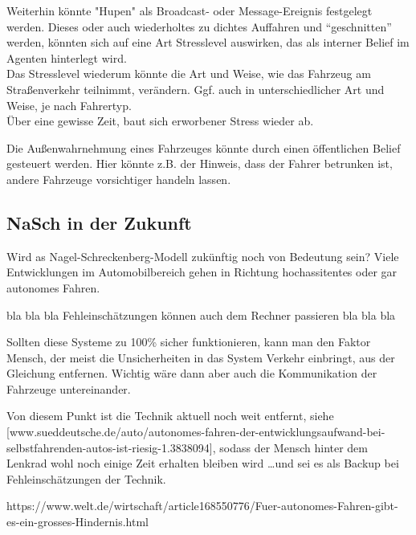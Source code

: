 Weiterhin könnte "Hupen" als Broadcast- oder Message-Ereignis festgelegt werden.
Dieses oder auch wiederholtes zu dichtes Auffahren und \enquote{geschnitten} werden, könnten sich auf eine Art Stresslevel auswirken, das als interner Belief im Agenten hinterlegt wird.
\\
Das Stresslevel wiederum könnte die Art und Weise, wie das Fahrzeug am Straßenverkehr teilnimmt, verändern. 
Ggf. auch in unterschiedlicher Art und Weise, je nach Fahrertyp.
\\
Über eine gewisse Zeit, baut sich erworbener Stress wieder ab.

Die Außenwahrnehmung eines Fahrzeuges könnte durch einen öffentlichen Belief gesteuert werden. 
Hier könnte z.B. der Hinweis, dass der Fahrer betrunken ist, andere Fahrzeuge vorsichtiger handeln lassen.








\subsection{NaSch in der Zukunft}

Wird as Nagel-Schreckenberg-Modell zukünftig noch von Bedeutung sein? 
Viele Entwicklungen im Automobilbereich gehen in Richtung hochassitentes oder gar autonomes Fahren.

bla bla bla Fehleinschätzungen können auch dem Rechner passieren bla bla bla

Sollten diese Systeme zu 100\% sicher funktionieren, kann man den Faktor Mensch, der meist die Unsicherheiten in das System Verkehr einbringt, aus der Gleichung entfernen.
Wichtig wäre dann aber auch die Kommunikation der Fahrzeuge untereinander.

Von diesem Punkt ist die Technik aktuell noch weit entfernt, siehe [www.sueddeutsche.de/auto/autonomes-fahren-der-entwicklungsaufwand-bei-selbstfahrenden-autos-ist-riesig-1.3838094], sodass der Mensch hinter dem Lenkrad wohl noch einige Zeit erhalten bleiben wird \dots und sei es als Backup bei Fehleinschätzungen der Technik.

https://www.welt.de/wirtschaft/article168550776/Fuer-autonomes-Fahren-gibt-es-ein-grosses-Hindernis.html
